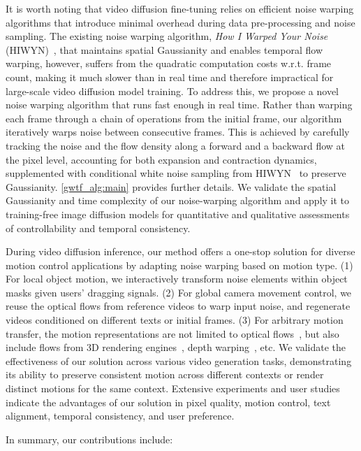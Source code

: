 It is worth noting that video diffusion fine-tuning relies on efficient noise warping algorithms that introduce minimal overhead during data pre-processing and noise sampling. The existing noise warping algorithm, \textit{How I Warped Your Noise} (HIWYN)~\cite{chang2024warped}, that maintains spatial Gaussianity and enables temporal flow warping, however, suffers from the quadratic computation costs w.r.t. frame count, making it much slower than in real time and therefore impractical for large-scale video diffusion model training. To address this, we propose a novel noise warping algorithm that runs fast enough in real time. Rather than warping each frame through a chain of operations from the initial frame, our algorithm iteratively warps noise between consecutive frames. This is achieved by carefully tracking the noise and the flow density along a forward and a backward flow at the pixel level, accounting for both expansion and contraction dynamics, supplemented with conditional white noise sampling from HIWYN~\citet{chang2024warped} to preserve Gaussianity. \cref{gwtf_alg:main} provides further details. We validate the spatial Gaussianity and time complexity of our noise-warping algorithm and apply it to training-free image diffusion models for quantitative and qualitative assessments of controllability and temporal consistency.

During video diffusion inference, our method offers a one-stop solution for diverse motion control applications by adapting noise warping based on motion type. (1) For local object motion, we interactively transform noise elements within object masks given users' dragging signals. (2) For global camera movement control, we reuse the optical flows from reference videos to warp input noise, and regenerate videos conditioned on different texts or initial frames. (3) For arbitrary motion transfer, the motion representations are not limited to optical flows~\cite{teed2020raft}, but also include flows from 3D rendering engines~\cite{villar2021learning}, depth warping~\cite{yu2024wonderjourney}, etc. We validate the effectiveness of our solution across various video generation tasks, demonstrating its ability to preserve consistent motion across different contexts or render distinct motions for the same context. Extensive experiments and user studies indicate the advantages of our solution in pixel quality, motion control, text alignment, temporal consistency, and user preference.

In summary, our contributions include:


